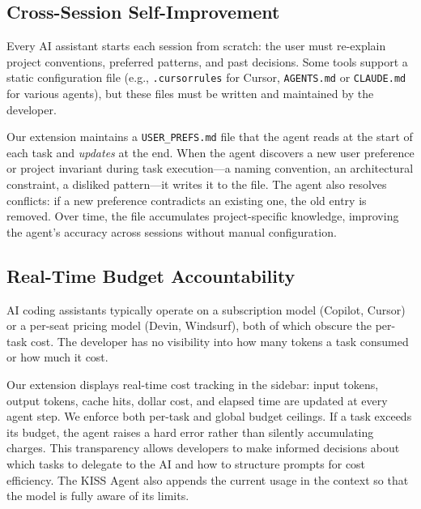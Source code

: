 \documentclass{article}
\begin{document}
\subsection{Cross-Session Self-Improvement}
\label{sec:self-improvement-feature}

Every AI assistant starts each session from scratch: the user must re-explain project conventions, preferred patterns, and past decisions. Some tools support a static configuration file (e.g., \texttt{.cursorrules} for Cursor, \texttt{AGENTS.md} or \texttt{CLAUDE.md} for various agents), but these files must be written and maintained by the developer.

Our extension maintains a \texttt{USER\_PREFS.md} file that the agent reads at the start of each task and \emph{updates} at the end.  When the agent discovers a new user preference or project invariant during task execution---a naming convention, an architectural constraint, a disliked pattern---it writes it to the file.  The agent also resolves conflicts: if a new preference contradicts an existing one, the old entry is removed.  Over time, the file accumulates project-specific knowledge, improving the agent's accuracy across sessions without manual configuration.

\subsection{Real-Time Budget Accountability}
\label{sec:budget-feature}

AI coding assistants typically operate on a subscription model (Copilot, Cursor) or a per-seat pricing model (Devin, Windsurf), both of which obscure the per-task cost.  The developer has no visibility into how many tokens a task consumed or how much it cost.

Our extension displays real-time cost tracking in the sidebar: input tokens, output tokens, cache hits, dollar cost, and elapsed time are updated at every agent step.  We enforce both per-task and global budget ceilings.  If a task exceeds its budget, the agent raises a hard error rather than silently accumulating charges.  This transparency allows developers to make informed decisions about which tasks to delegate to the AI and how to structure prompts for cost efficiency.  The KISS Agent also appends the current usage in the context so that the model is fully aware of its limits.
\end{document}
